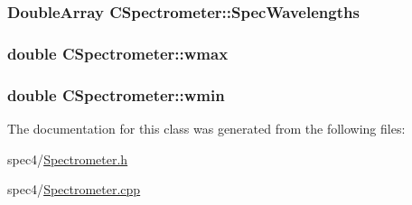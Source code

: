 \label{classCSpectrometer_ac04b2fce0185a9c84cb6f636e36a4f8b}
\hypertarget{classCSpectrometer_abb04ee8adc4b30350e23f00aea799dec}{
\subsubsection[{SpecWavelengths}]{\setlength{\rightskip}{0pt plus 5cm}DoubleArray {\bf CSpectrometer::SpecWavelengths}}}
\label{classCSpectrometer_abb04ee8adc4b30350e23f00aea799dec}
\hypertarget{classCSpectrometer_a2baa66aaecaf486e610e352a89799609}{
\subsubsection[{wmax}]{\setlength{\rightskip}{0pt plus 5cm}double {\bf CSpectrometer::wmax}}}
\label{classCSpectrometer_a2baa66aaecaf486e610e352a89799609}
\hypertarget{classCSpectrometer_a82f43ea9e9294a0e5f4f5609464db845}{
\subsubsection[{wmin}]{\setlength{\rightskip}{0pt plus 5cm}double {\bf CSpectrometer::wmin}}}
\label{classCSpectrometer_a82f43ea9e9294a0e5f4f5609464db845}


The documentation for this class was generated from the following files:\begin{DoxyCompactItemize}
\item 
spec4/\hyperlink{Spectrometer_8h}{Spectrometer.h}\item 
spec4/\hyperlink{Spectrometer_8cpp}{Spectrometer.cpp}\end{DoxyCompactItemize}
